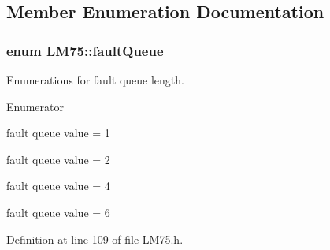 \subsection{Member Enumeration Documentation}
\hypertarget{class_l_m75_adc17def542ebe019d6ef064bdcb37f10}{
\subsubsection[{fault\-Queue}]{\setlength{\rightskip}{0pt plus 5cm}enum {\bf L\-M75\-::fault\-Queue}}}\label{class_l_m75_adc17def542ebe019d6ef064bdcb37f10}
Enumerations for fault queue length. \begin{Desc}
\item[Enumerator]\par
\begin{description}
\item[{\em 
\hypertarget{class_l_m75_adc17def542ebe019d6ef064bdcb37f10ab097f0541ef6ffca709899a977e4d0ab}{F\-Q\-\_\-1}\label{class_l_m75_adc17def542ebe019d6ef064bdcb37f10ab097f0541ef6ffca709899a977e4d0ab}
}]fault queue value = 1 \item[{\em 
\hypertarget{class_l_m75_adc17def542ebe019d6ef064bdcb37f10a6f1c5562402075a0adf5cd4fe4f73e41}{F\-Q\-\_\-2}\label{class_l_m75_adc17def542ebe019d6ef064bdcb37f10a6f1c5562402075a0adf5cd4fe4f73e41}
}]fault queue value = 2 \item[{\em 
\hypertarget{class_l_m75_adc17def542ebe019d6ef064bdcb37f10a441964c9648220f4d1201a918ee3a57d}{F\-Q\-\_\-4}\label{class_l_m75_adc17def542ebe019d6ef064bdcb37f10a441964c9648220f4d1201a918ee3a57d}
}]fault queue value = 4 \item[{\em 
\hypertarget{class_l_m75_adc17def542ebe019d6ef064bdcb37f10a65995a2615014d4805da07bdd2a70772}{F\-Q\-\_\-6}\label{class_l_m75_adc17def542ebe019d6ef064bdcb37f10a65995a2615014d4805da07bdd2a70772}
}]fault queue value = 6 \end{description}
\end{Desc}


Definition at line 109 of file L\-M75.\-h.

